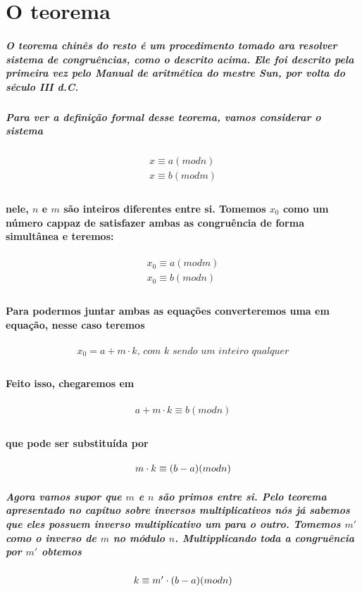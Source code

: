 \section{O teorema}

\subparagraph{
O teorema chin\^es do resto \'e um procedimento tomado ara resolver sistema de congru\^encias, como o descrito acima. Ele foi descrito pela primeira vez pelo Manual de aritm\'etica do mestre Sun, por volta do s\'eculo III d.C. 
}
\subparagraph{
Para ver a defini\c{c}\~ao formal desse teorema, vamos considerar o sistema
}
\[	
	\begin{array}{c}
		\textit{$x \equiv a (mod n)$}\\
		\textit{$x \equiv b (mod m)$}\\
	\end{array}
\]
\paragraph{
nele, $n$ e $m$ s\~ao inteiros diferentes entre si. Tomemos $x_0$ como um n\'umero cappaz de satisfazer ambas as congru\^encia de forma simult\^anea e teremos:
}
\[	
	\begin{array}{c}
		\textit{$x_0 \equiv a (mod m)$}\\
		\textit{$x_0 \equiv b (mod n)$}\\
	\end{array}
\]
\paragraph{
Para podermos juntar ambas as equa\c{c}\~oes converteremos uma em equa\c{c}\~ao, nesse caso teremos 
}
\[	
	\begin{array}{c}
		\textit{$x_0 = a + m\cdot k$, com $k$ sendo um inteiro qualquer}\\
	\end{array}
\]
\paragraph{
Feito isso, chegaremos em
}
\[	
	\begin{array}{c}
		\textit{$a + m\cdot k \equiv b (mod n)$}\\
	\end{array}
\]
\paragraph{
que pode ser substitu\'ida por
}
\[	
	\begin{array}{c}
		\textit{$ m\cdot k \equiv (b-a) (mod n)$}\\
	\end{array}
\]
\subparagraph{
Agora vamos supor que $m$ e $n$ s\~ao primos entre si. Pelo teorema apresentado no cap\'ituo sobre inversos multiplicativos n\'os j\'a sabemos que eles possuem inverso multiplicativo um para o outro. Tomemos $m'$ como o inverso de $m$ no m\'odulo $n$. Multipplicando toda a congru\^encia por $m'$ obtemos
}
\[	
	\begin{array}{c}
		\textit{$ k \equiv m'\cdot(b-a) (mod n)$}\\
	\end{array}
\]